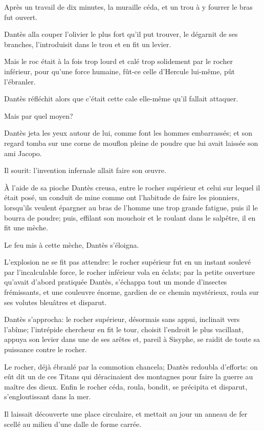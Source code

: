 Après un travail de dix minutes, la muraille céda, et un trou à y fourrer le bras fut ouvert.

Dantès alla couper l'olivier le plus fort qu'il put trouver, le dégarnit de ses branches, l'introduisit dans le trou et en fit un levier.

Mais le roc était à la fois trop lourd et calé trop solidement par le rocher inférieur, pour qu'une force humaine, fût-ce celle d'Hercule lui-même, pût l'ébranler.

Dantès réfléchit alors que c'était cette cale elle-même qu'il fallait attaquer.

Mais par quel moyen?

Dantès jeta les yeux autour de lui, comme font les hommes embarrassés; et son regard tomba sur une corne de mouflon pleine de poudre que lui avait laissée son ami Jacopo.

Il sourit: l'invention infernale allait faire son œuvre.

À l'aide de sa pioche Dantès creusa, entre le rocher supérieur et celui sur lequel il était posé, un conduit de mine comme ont l'habitude de faire les pionniers, lorsqu'ils veulent épargner au bras de l'homme une trop grande fatigue, puis il le bourra de poudre; puis, effilant son mouchoir et le roulant dans le salpêtre, il en fit une mèche.

Le feu mis à cette mèche, Dantès s'éloigna.

L'explosion ne se fit pas attendre: le rocher supérieur fut en un instant soulevé par l'incalculable force, le rocher inférieur vola en éclats; par la petite ouverture qu'avait d'abord pratiquée Dantès, s'échappa tout un monde d'insectes frémissants, et une couleuvre énorme, gardien de ce chemin mystérieux, roula sur ses volutes bleuâtres et disparut.

Dantès s'approcha: le rocher supérieur, désormais sans appui, inclinait vers l'abîme; l'intrépide chercheur en fit le tour, choisit l'endroit le plus vacillant, appuya son levier dans une de ses arêtes et, pareil à Sisyphe, se raidit de toute sa puissance contre le rocher.

Le rocher, déjà ébranlé par la commotion chancela; Dantès redoubla d'efforts: on eût dit un de ces Titans qui déracinaient des montagnes pour faire la guerre au maître des dieux. Enfin le rocher céda, roula, bondit, se précipita et disparut, s'engloutissant dans la mer.

Il laissait découverte une place circulaire, et mettait au jour un anneau de fer scellé au milieu d'une dalle de forme carrée.

